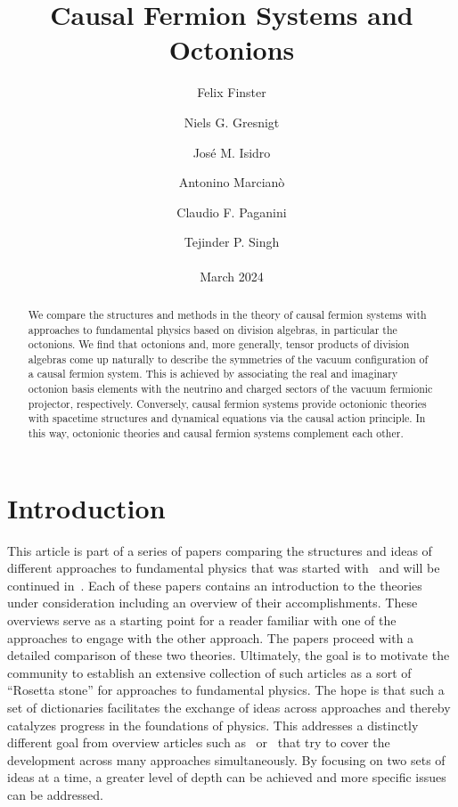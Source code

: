 \documentclass[reqno,11pt]{amsart}
\title[Causal Fermion Systems and Octonions]{Causal Fermion Systems and Octonions}
\author[F.\ Finster]{Felix Finster}
\author[N.G.\ Gresnigt]{Niels G. Gresnigt}
\author[J.M.\ Isidro]{Jos{\'e} M. Isidro}
\author[A.\ Marcian{\`o}]{Antonino Marcian{\`o}}
\author[C.F.\ Paganini]{Claudio F. Paganini}
\author[T.P.\ Singh]{Tejinder P. Singh \\ \\ March 2024}
\numberwithin{equation}{section}
\newcommand{\1}{\mbox{\rm 1 \hspace{-1.05 em} 1}}
\begin{document}
\maketitle

\begin{abstract}
We compare the structures and methods in the theory of causal fermion systems
with approaches to fundamental physics based on division algebras, in particular the octonions.
We find that octonions and, more generally, tensor products of division algebras come up naturally to describe
the symmetries of the vacuum configuration of a causal fermion system.
This is achieved by associating the real and imaginary octonion basis elements with the neutrino and charged sectors of the vacuum fermionic projector, respectively. Conversely,
causal fermion systems provide octonionic theories with
spacetime structures and dynamical equations via the causal action principle.
In this way, octonionic theories and causal fermion systems complement each other.
\end{abstract}

\tableofcontents

\section{Introduction} \label{secintro}
This article is part of a series of papers comparing the structures and ideas of different approaches to fundamental physics that was started with~\cite{eth-cfs, mmt-cfs} and will be continued in~\cite{cfstdqg, tracedynamics}. Each of these papers contains an introduction to the theories under consideration including an overview of their accomplishments. These overviews serve as a starting point for a reader familiar with one of the approaches to engage with the other approach. The papers proceed with a detailed comparison of these two theories. Ultimately, the goal is to motivate the community to establish an extensive collection of such articles as a sort of ``Rosetta stone'' for approaches to fundamental physics. The hope is that such a set of dictionaries facilitates the exchange of ideas across approaches and thereby catalyzes progress in the foundations of physics. This addresses a distinctly different goal from overview articles such as~\cite{loll2022quantum, Mielczarek_2018, deBoer:2824341} or~\cite{addazi2022quantum} that try to cover the development across many approaches simultaneously. By focusing on two sets of ideas at a time, a greater level of depth can be achieved and more specific issues can be addressed.
\end{document}
